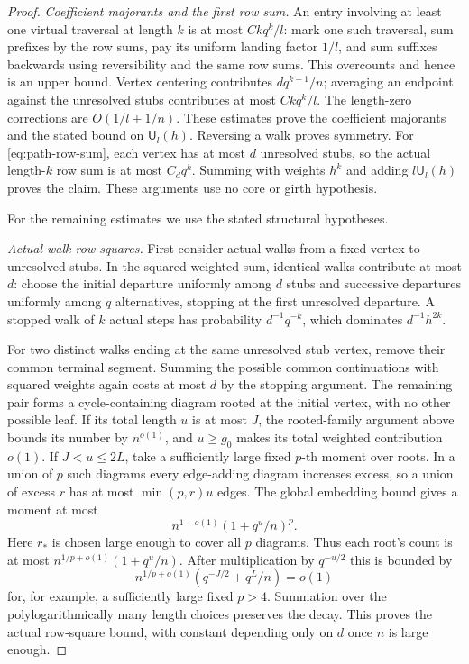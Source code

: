 \begin{proof}
\emph{Coefficient majorants and the first row sum.}
An entry involving at least one virtual traversal at length $k$ is at
most $Ckq^k/l$: mark one such traversal, sum prefixes by the row sums,
pay its uniform landing factor $1/l$, and sum suffixes backwards using
reversibility and the same row sums. This overcounts and hence is an
upper bound. Vertex centering contributes $dq^{k-1}/n$; averaging an
endpoint against the unresolved stubs contributes at most $Ckq^k/l$.
The length-zero corrections are $O(1/l+1/n)$. These estimates prove the
coefficient majorants and the stated bound on $\mathsf U_l(h)$.
Reversing a walk proves symmetry. For \eqref{eq:path-row-sum}, each
vertex has at most $d$ unresolved stubs, so the actual length-$k$ row
sum is at most $C_dq^k$. Summing with weights $h^k$ and adding
$l\mathsf U_l(h)$ proves the claim. These arguments use no core or
girth hypothesis.

For the remaining estimates we use the stated structural hypotheses.

\emph{Actual-walk row squares.}
First consider actual walks from a fixed vertex to unresolved stubs.
In the squared weighted sum, identical walks contribute at most $d$:
choose the initial departure uniformly among $d$ stubs and successive
departures uniformly among $q$ alternatives, stopping at the first
unresolved departure. A stopped walk of $k$ actual steps has probability
$d^{-1}q^{-k}$, which dominates $d^{-1}h^{2k}$.

For two distinct walks ending at the same unresolved stub vertex,
remove their common terminal segment. Summing the possible common
continuations with squared weights again costs at most $d$ by the
stopping argument. The remaining pair forms a cycle-containing
diagram rooted at the initial vertex, with no other possible leaf.
If its total length $u$ is at most $J$, the rooted-family argument
above bounds its number by $n^{o(1)}$, and $u\ge g_0$ makes its total
weighted contribution $o(1)$. If $J<u\le2L$, take a sufficiently large
fixed $p$-th moment over roots. In a union of $p$ such diagrams every
edge-adding diagram increases excess, so a union of excess $r$ has at
most $\min(p,r)u$ edges. The global embedding bound gives a moment at
most
\[
 n^{1+o(1)}(1+q^u/n)^p.
\]
Here $r_*$ is chosen large enough to cover all $p$ diagrams. Thus each
root's count is at most $n^{1/p+o(1)}(1+q^u/n)$. After multiplication
by $q^{-u/2}$ this is bounded by
\[
 n^{1/p+o(1)}(q^{-J/2}+q^L/n)=o(1)
\]
for, for example, a sufficiently large fixed $p>4$. Summation over
the polylogarithmically many length choices preserves the decay. This proves
the actual row-square bound, with constant depending only on $d$ once
$n$ is large enough.


\end{proof}
